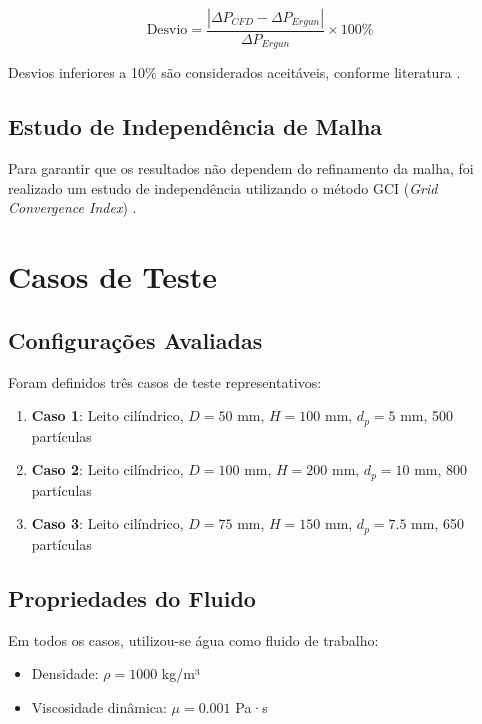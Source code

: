 \begin{equation}
\text{Desvio} = \frac{|\Delta P_{CFD} - \Delta P_{Ergun}|}{\Delta P_{Ergun}} \times 100\%
\label{eq:desvio}
\end{equation}

Desvios inferiores a 10\% são considerados aceitáveis, conforme literatura \cite{dixon2006}.

\subsection{Estudo de Independência de Malha}

Para garantir que os resultados não dependem do refinamento da malha, foi realizado um estudo de independência utilizando o método GCI (\textit{Grid Convergence Index}) \cite{roache1994}.

\section{Casos de Teste}

\subsection{Configurações Avaliadas}

Foram definidos três casos de teste representativos:

\begin{enumerate}
    \item \textbf{Caso 1}: Leito cilíndrico, $D = 50$ mm, $H = 100$ mm, $d_p = 5$ mm, 500 partículas
    \item \textbf{Caso 2}: Leito cilíndrico, $D = 100$ mm, $H = 200$ mm, $d_p = 10$ mm, 800 partículas
    \item \textbf{Caso 3}: Leito cilíndrico, $D = 75$ mm, $H = 150$ mm, $d_p = 7.5$ mm, 650 partículas
\end{enumerate}

\subsection{Propriedades do Fluido}

Em todos os casos, utilizou-se água como fluido de trabalho:
\begin{itemize}
    \item Densidade: $\rho = 1000$ kg/m³
    \item Viscosidade dinâmica: $\mu = 0.001$ Pa·s
\end{itemize}

